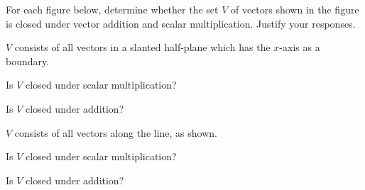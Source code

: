 \documentclass{ximera}
\begin{document}
\begin{problem} For each figure below, determine whether the set $V$ of vectors shown in the figure is closed under vector addition and scalar multiplication.  Justify your responses.
  
\begin{problem} $V$ consists of all vectors in a slanted half-plane which has the $x$-axis as a boundary.


Is $V$ closed under scalar multiplication?
 
 \begin{multipleChoice}
 \end{multipleChoice}
 
 Is $V$ closed under addition?
 
 \begin{multipleChoice}
 \end{multipleChoice}
\end{problem}

\begin{problem} 
$V$ consists of all vectors along the line, as shown.

 
 Is $V$ closed under scalar multiplication?
 
 \begin{multipleChoice}
 \end{multipleChoice}
 
 Is $V$ closed under addition?
 
 \begin{multipleChoice}
 \end{multipleChoice}
\end{problem}    
\end{problem}
\end{document}
